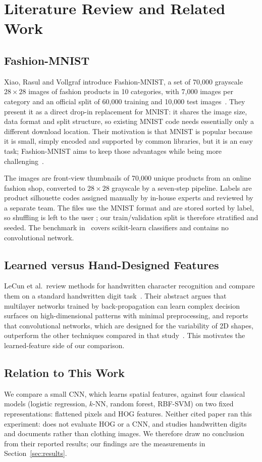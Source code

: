\section{Literature Review and Related Work}
\label{sec:related}

\subsection{Fashion-MNIST}
Xiao, Rasul and Vollgraf introduce Fashion-MNIST, a set of 70{,}000 grayscale
$28\times 28$ images of fashion products in 10 categories, with 7{,}000 images per category
and an official split of 60{,}000 training and 10{,}000 test images~\cite{xiao2017fashion}.
They present it as a direct drop-in replacement for MNIST: it shares the image size, data
format and split structure, so existing MNIST code needs essentially only a different download
location. Their motivation is that MNIST is popular because it is small, simply encoded and
supported by common libraries, but it is an easy task; Fashion-MNIST aims to keep those
advantages while being more challenging~\cite{xiao2017fashion}.

The images are front-view thumbnails of 70{,}000 unique products from an online fashion shop,
converted to $28\times 28$ grayscale by a seven-step pipeline. Labels are product silhouette
codes assigned manually by in-house experts and reviewed by a separate team. The files use the
MNIST format and are stored sorted by label, so shuffling is left to the user
\cite{xiao2017fashion}; our train/validation split is therefore stratified and seeded. The
benchmark in~\cite{xiao2017fashion} covers scikit-learn classifiers and contains no
convolutional network.

\subsection{Learned versus Hand-Designed Features}
LeCun et al.\ review methods for handwritten character recognition and compare them on a
standard handwritten digit task~\cite{lecun1998gradient}. Their abstract argues that
multilayer networks trained by back-propagation can learn complex decision surfaces on
high-dimensional patterns with minimal preprocessing, and reports that convolutional networks,
which are designed for the variability of 2D shapes, outperform the other techniques compared
in that study~\cite{lecun1998gradient}. This motivates the learned-feature side of our
comparison.

\subsection{Relation to This Work}
We compare a small CNN, which learns spatial features, against four classical models
(logistic regression, $k$-NN, random forest, RBF-SVM) on two fixed representations: flattened
pixels and HOG features. Neither cited paper ran this experiment: \cite{xiao2017fashion}
does not evaluate HOG or a CNN, and \cite{lecun1998gradient} studies handwritten digits and
documents rather than clothing images. We therefore draw no conclusion from their reported
results; our findings are the measurements in Section~\ref{sec:results}.
